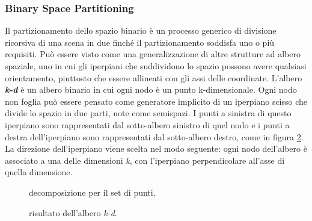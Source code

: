 \subsubsection{Binary Space Partitioning}
\label{sssec:binaryspace}
Il partizionamento dello spazio binario è un processo generico di divisione
ricorsiva di una scena in due finché il partizionamento soddisfa uno o più
requisiti.
Può essere visto come una generalizzazione di altre strutture ad albero spaziale,
uno in cui gli iperpiani che suddividono lo spazio possono avere qualsiasi
orientamento, piuttosto che essere allineati con gli assi delle coordinate.\cite{wiki:bsp}
L'albero \textbf{\emph{k-d}} è un albero binario in cui ogni nodo è un punto
k-dimensionale. Ogni nodo non foglia può essere pensato come generatore
implicito di un iperpiano scisso che divide lo spazio in due parti, note come
semispazi. I punti a sinistra di questo iperpiano sono rappresentati dal
sotto-albero sinistro di quel nodo e i punti a destra dell'iperpiano sono
rappresentati dal sotto-albero destro, come in figura \ref{fig:albero}.
La direzione dell'iperpiano viene scelta nel modo seguente: ogni nodo
dell'albero è associato a una delle dimensioni \emph{k}, con l'iperpiano
perpendicolare all'asse di quella dimensione.\cite{wiki:kdtree}

\begin{figure}[!htb]
  \centering
  \resizebox{0.7\linewidth}{!}{}
  \caption{decomposizione per il set di punti.}
  \label{fig:decomposizione}
\end{figure}

\begin{figure}[!htb]
\centering
    \resizebox{0.7\linewidth}{!}{}
\caption{risultato dell'albero \emph{k-d}.}
\label{fig:albero}
\end{figure}
